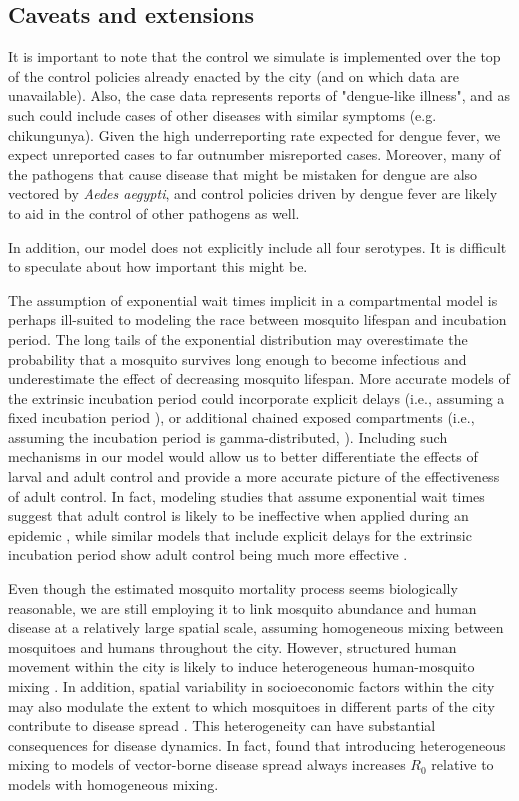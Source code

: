\documentclass[10pt,letterpaper]{article}
\begin{document}
\subsection*{Caveats and extensions}

It is important to note that the control we simulate is implemented over the top of the control policies already enacted by the city (and on which data are unavailable).
Also, the case data represents reports of "dengue-like illness", and as such could include cases of other diseases with similar symptoms (e.g. chikungunya).
Given the high underreporting rate expected for dengue fever, we expect unreported cases to far outnumber misreported cases.
Moreover, many of the pathogens that cause disease that might be mistaken for dengue are also vectored by \emph{Aedes aegypti}, and control policies driven by dengue fever are likely to aid in the control of other pathogens as well.

In addition, our model does not explicitly include all four serotypes.  
It is difficult to speculate about how important this might be.

The assumption of exponential wait times implicit in a compartmental model is perhaps ill-suited to modeling the race between mosquito lifespan and incubation period.
The long tails of the exponential distribution may overestimate the probability that a mosquito survives long enough to become infectious and underestimate the effect of decreasing mosquito lifespan.
More accurate models of the extrinsic incubation period could incorporate explicit delays (i.e., assuming a fixed incubation period \cite{Burattini2008}), or additional chained exposed compartments (i.e., assuming the incubation period is gamma-distributed, \cite{Lloyd2001}).
Including such mechanisms in our model would allow us to better differentiate the effects of larval and adult control and provide a more accurate picture of the effectiveness of adult control.
In fact, modeling studies that assume exponential wait times suggest that adult control is likely to be ineffective when applied during an epidemic \cite{Newton1992, Pinho2010}, while similar models that include explicit delays for the extrinsic incubation period show adult control being much more effective \cite{Burattini2008}.

Even though the estimated mosquito mortality process seems biologically reasonable, we are still employing it to link mosquito abundance and human disease at a relatively large spatial scale, assuming homogeneous mixing between mosquitoes and humans throughout the city.
However, structured human movement within the city is likely to induce heterogeneous human-mosquito mixing \cite{Adams2009, Cosner2009a, Stoddard2009}.
In addition, spatial variability in socioeconomic factors within the city may also modulate the extent to which mosquitoes in different parts of the city contribute to disease spread \cite{Mondini2008, Honorio2009, Hu2012, DeMattosAlmeida2007}.
This heterogeneity can have substantial consequences for disease dynamics.
In fact, \cite{Dye1986, Hasibeder1988} found that introducing heterogeneous mixing to models of vector-borne disease spread always increases $R_0$ relative to models with homogeneous mixing.
\end{document}
